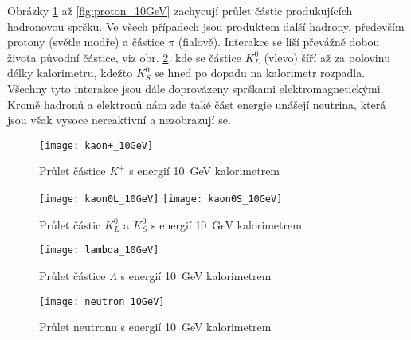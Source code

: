 \documentclass{protokol}
\begin{document}
    \vspace{-10pt}

    Obrázky \ref{fig:kaon+_10GeV} až \ref{fig:proton_10GeV} zachycují průlet částic produkujících hadronovou spršku. Ve všech případech jsou produktem další hadrony, především protony (světle modře) a částice $\pi$ (fialově). Interakce se liší převážně dobou života původní částice, viz obr. \ref{fig:kaon0_10GeV}, kde se částice $K_L^0$ (vlevo) šíří až za polovinu délky kalorimetru, kdežto $K_S^0$ se hned po dopadu na kalorimetr rozpadla. Všechny tyto interakce jsou dále doprovázeny sprškami elektromagnetickými. Kromě hadronů a elektronů nám zde také část energie unášejí neutrina, která jsou však vysoce nereaktivní a nezobrazují se.

    \begin{figure}[H]
      \centering
      \texttt{[image: kaon+\_10GeV]}
      \vspace{-10pt}
      \caption{Průlet částice $K^+$ s energií \SI{10}{GeV} kalorimetrem}
      \label{fig:kaon+_10GeV}
    \end{figure}

    \vspace{-10pt}

    \begin{figure}[H]
      \centering
      \texttt{[image: kaon0L\_10GeV]}
      \texttt{[image: kaon0S\_10GeV]}
      \vspace{-10pt}
      \caption{Průlet částic $K^0_L$ a $K^0_S$ s energií \SI{10}{GeV} kalorimetrem}
      \label{fig:kaon0_10GeV}
    \end{figure}

    \vspace{-10pt}

    \begin{figure}[H]
      \centering
      \texttt{[image: lambda\_10GeV]}
      \vspace{-10pt}
      \caption{Průlet částice $\Lambda$ s energií \SI{10}{GeV} kalorimetrem}
      \label{fig:lambda_10GeV}
    \end{figure}

    \vspace{-10pt}

    \begin{figure}[H]
      \centering
      \texttt{[image: neutron\_10GeV]}
      \vspace{-10pt}
      \caption{Průlet neutronu s energií \SI{10}{GeV} kalorimetrem}
      \label{fig:neutron_10GeV}
    \end{figure}
\end{document}
